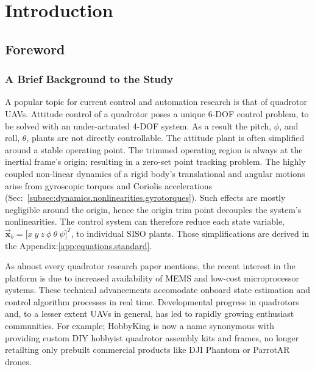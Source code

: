 \chapter{Introduction}
\label{ch:intro}
\section{Foreword}
\label{sec:intro.foreword}
\subsection{A Brief Background to the Study}
\label{subsec:intro.foreword.background}
A popular topic for current control and automation research is that of quadrotor UAVs. Attitude control of a quadrotor poses a unique 6-DOF control problem, to be solved with an under-actuated 4-DOF system. As a result the pitch, $\phi$, and roll, $\theta$, plants are not directly controllable. The attitude plant is often simplified around a stable operating point. The trimmed operating region is always at the inertial frame's origin; resulting in a zero-set point tracking problem. The highly coupled non-linear dynamics of a rigid body's translational and angular motions arise from gyroscopic torques and Coriolis accelerations (Sec:~\ref{subsec:dynamics.nonlinearities.gyrotorques}). Such effects are mostly negligible around the origin, hence the origin trim point decouples the system's nonlinearities. The control system can therefore reduce each state variable, $\vec{\mathbf{x}}_b=\big[x~y~z~\phi~\theta~\psi\big]^T$, to individual SISO plants. Those simplifications are derived in the Appendix:\ref{app:equations.standard}.
\par
As almost every quadrotor research paper mentions, the recent interest in the platform is due to increased availability of MEMS and low-cost microprocessor systems. These technical advancements accomodate onboard state estimation and control algorithm processes in real time. Developmental progress in quadrotors and, to a lesser extent UAVs in general, has led to rapidly growing enthusiast communities. For example; HobbyKing\cite{hobbyking} is now a name synonymous with providing custom DIY hobbyist quadrotor assembly kits and frames, no longer retailting only prebuilt commercial products like DJI Phantom\cite{phantom} or ParrotAR\cite{parrotar} drones.
